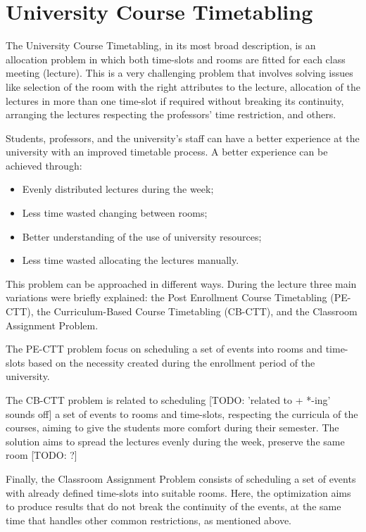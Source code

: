 \section{University Course Timetabling}

The University Course Timetabling, in its most broad description, is an allocation problem in which both time-slots and rooms are fitted for each class meeting (lecture). This is a very challenging problem that involves solving issues like selection of the room with the right attributes to the lecture, allocation of the lectures in more than one time-slot if required without breaking its continuity, arranging the lectures respecting the professors' time restriction, and others.


Students, professors, and the university's staff can have a better experience at the university with an improved timetable process. A better experience can be achieved through:
\begin{itemize}
    \item Evenly distributed lectures during the week;
    \item Less time wasted changing between rooms;
    \item Better understanding of the use of university resources;
    \item Less time wasted allocating the lectures manually.
\end{itemize}

This problem can be approached in different ways. During the lecture three main variations were briefly explained: the Post Enrollment Course Timetabling (PE-CTT), the Curriculum-Based Course Timetabling (CB-CTT), and the Classroom Assignment Problem.

The PE-CTT problem focus on scheduling a set of events into rooms and time-slots based on the necessity created during the enrollment period of the university.

The CB-CTT problem is related to scheduling [TODO: 'related to + *-ing' sounds off] a set of events to rooms and time-slots, respecting the curricula of the courses, aiming to give the students more comfort during their semester. The solution aims to spread the lectures evenly during the week, preserve the same room [TODO: ?]

Finally, the  Classroom Assignment Problem consists of scheduling a set of events with already defined time-slots into suitable rooms. Here, the optimization aims to produce results that do not break the continuity of the events, at the same time that handles other common restrictions, as mentioned above.

